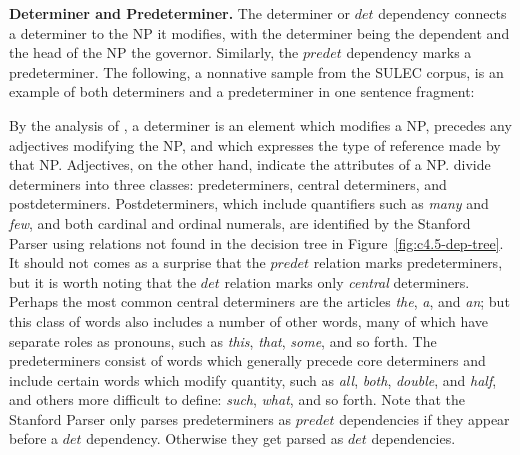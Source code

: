 \documentclass[main.tex]{subfiles}
\begin{document}
\textbf{Determiner and Predeterminer.} The determiner or $det$ dependency connects a determiner to the NP it modifies, with the determiner being the dependent and the head of the NP the governor. Similarly, the $predet$ dependency marks a predeterminer. The following, a nonnative sample from the SULEC corpus, is an example of both determiners and a predeterminer in one sentence fragment: 
\newline\newline {}
\newline

By the analysis of \citet[p. 253]{quirk:1985}, a determiner is an element which modifies a NP, precedes any adjectives modifying the NP, and which expresses the type of reference made by that NP. Adjectives, on the other hand, indicate the attributes of a NP. \citeauthor{quirk:1985} divide determiners into three classes: predeterminers, central determiners, and postdeterminers. Postdeterminers, which include quantifiers such as \textit{many} and \textit{few}, and both cardinal and ordinal numerals, are identified by the Stanford Parser using relations not found in the decision tree in Figure~\ref{fig:c4.5-dep-tree}. It should not comes as a surprise that the $predet$ relation marks predeterminers, but it is worth noting that the $det$ relation marks only \textit{central} determiners. Perhaps the most common central determiners are the articles \textit{the}, \textit{a}, and \textit{an}; but this class of words also includes a number of other words, many of which have separate roles as pronouns, such as \textit{this}, \textit{that}, \textit{some}, and so forth. The predeterminers consist of words which generally precede core determiners and include certain words which modify quantity, such as \textit{all}, \textit{both}, \textit{double}, and \textit{half}, and others more difficult to define: \textit{such}, \textit{what}, and so forth. Note that the Stanford Parser only parses predeterminers as $predet$ dependencies if they appear before a $det$ dependency. Otherwise they get parsed as $det$ dependencies.
\end{document}

